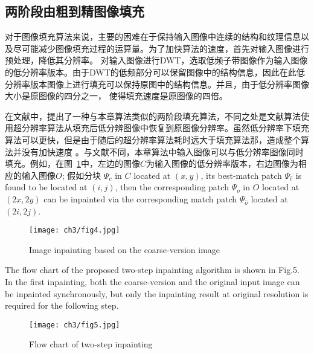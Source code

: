 \subsection{两阶段由粗到精图像填充}
\label{sec:2.2}
对于图像填充算法来说，主要的困难在于保持输入图像中连续的结构和纹理信息以及尽可能减少图像填充过程的运算量。为了加快算法的速度，首先对输入图像进行预处理，降低其分辨率。 对输入图像进行DWT，选取低频子带图像作为输入图像的低分辨率版本。由于DWT的低频部分可以保留图像中的结构信息，因此在此低分辨率版本图像上进行填充可以保持原图中的结构信息。并且，由于低分辨率图像大小是原图像的四分之一， 使得填充速度是原图像的四倍。\par
在文献中，提出了一种与本章算法类似的两阶段填充算法，不同之处是文献算法使用超分辨率算法从填充后低分辨图像中恢复到原图像分辨率。虽然低分辨率下填充算法可以更快，但是由于随后的超分辨率算法耗时远大于填充算法那，造成整个算法并没有加快速度 。与文献不同，本章算法中输入图像可以与低分辨率图像同时填充。例如，在图~\ref{ch3:fig:4}中，左边的图像\(C\)为输入图像的低分辨率版本，右边图像为相应的输入图像\(O\); 假如分块 \(\Psi_c\) in \(C\) located at \((x,y)\), its best-match patch \(\Psi_{\hat{c}}\) is found to be located at \((i, j)\), then the corresponding patch \(\Psi_o\) in \(O\) located at \((2x, 2y)\) can be inpainted via the corresponding match patch \(\Psi_{\hat{o}}\) located at \((2i, 2j)\).
\begin{figure}[!htbp]
	\begin{center}
			\texttt{[image: ch3/fig4.jpg]}
	\end{center}
    \caption{Image inpainting based on the coarse-version image}
	\label{ch3:fig:4}
\end{figure}
The flow chart of the proposed two-step inpainting algorithm is shown in Fig.5. In the first inpainting, both the coarse-version and the original input image can be inpainted synchronously, but only the inpainting result at original resolution is required for the following step.\par
\begin{figure}[!htbp]
\begin{center}
  \texttt{[image: ch3/fig5.jpg]}
\end{center}
\caption{Flow chart of two-step inpainting}
\label{fig:5}       %
\end{figure}

